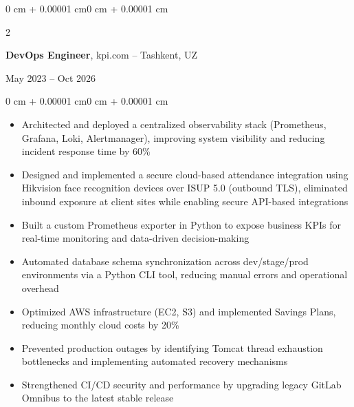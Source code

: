 \documentclass[10pt, letterpaper]{article}
\newenvironment{highlights}{
    \begin{itemize}[
        topsep=0.10 cm,
        parsep=0.10 cm,
        partopsep=0pt,
        itemsep=0pt,
        leftmargin=0 cm + 10pt
    ]
}{
    \end{itemize}
}
\newenvironment{onecolentry}{
    \begin{adjustwidth}{0 cm + 0.00001 cm}{0 cm + 0.00001 cm}
}{
    \end{adjustwidth}
}
\newenvironment{twocolentry}[2][]{
    \onecolentry
    \def\secondColumn{#2}
    \setcolumnwidth{\fill, 4.5 cm}
    \begin{paracol}{2}
}{
    \switchcolumn \raggedleft \secondColumn
    \end{paracol}
    \endonecolentry
}
\begin{document}
    \begin{twocolentry}{May 2023 -- Oct 2026}
        \textbf{DevOps Engineer}, kpi.com -- Tashkent, UZ
    \end{twocolentry}
    \vspace{0.10 cm}
    \begin{onecolentry}
        \begin{highlights}
            \item Architected and deployed a centralized observability stack (Prometheus, Grafana, Loki, Alertmanager), improving system visibility and reducing incident response time by 60\%
            \item Designed and implemented a secure cloud-based attendance integration using Hikvision face recognition devices over ISUP 5.0 (outbound TLS), eliminated inbound exposure at client sites while enabling secure API-based integrations
            \item Built a custom Prometheus exporter in Python to expose business KPIs for real-time monitoring and data-driven decision-making
            \item Automated database schema synchronization across dev/stage/prod environments via a Python CLI tool, reducing manual errors and operational overhead
            \item Optimized AWS infrastructure (EC2, S3) and implemented Savings Plans, reducing monthly cloud costs by 20\%
            \item Prevented production outages by identifying Tomcat thread exhaustion bottlenecks and implementing automated recovery mechanisms
            \item Strengthened CI/CD security and performance by upgrading legacy GitLab Omnibus to the latest stable release
        \end{highlights}
    \end{onecolentry}
    \vspace{0.20 cm}
    
\end{document}
